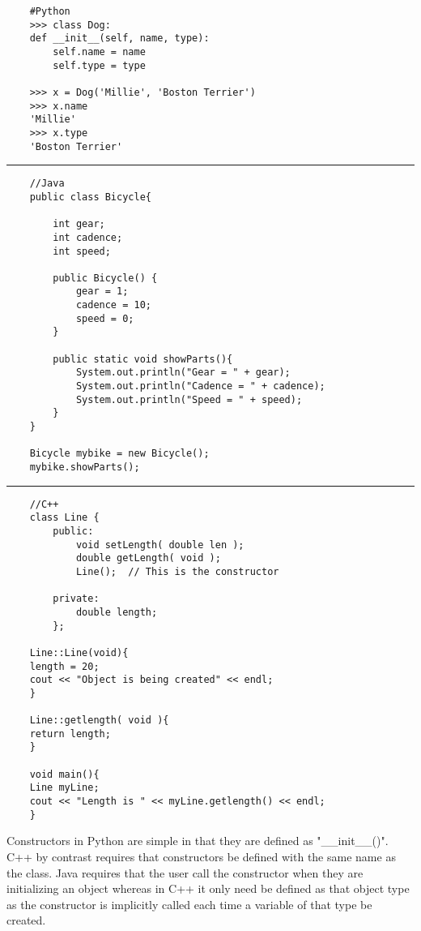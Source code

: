\documentclass[journal,10pt,onecolumn,compsoc]{IEEEtran} \usepackage[margin=1.0in]{geometry} \usepackage{pdfpages} \usepackage{graphicx}
\begin{document}
\begin{verbatim}
	#Python
	>>> class Dog:
	def __init__(self, name, type):
		self.name = name
		self.type = type

	>>> x = Dog('Millie', 'Boston Terrier')
	>>> x.name 
	'Millie'
	>>> x.type
	'Boston Terrier'
\end{verbatim}
\begin{center}
\noindent\rule{8cm}{0.4pt}
\end{center}
\begin{verbatim}
	//Java
	public class Bicycle{
    	
        int gear;
        int cadence;
        int speed;
        
		public Bicycle() {
			gear = 1;
			cadence = 10;
			speed = 0;
		}
        
		public static void showParts(){
			System.out.println("Gear = " + gear);
			System.out.println("Cadence = " + cadence);
			System.out.println("Speed = " + speed);
		}
	}

	Bicycle mybike = new Bicycle();
	mybike.showParts();
\end{verbatim}
\begin{center}
\noindent\rule{8cm}{0.4pt}
\end{center}
\begin{verbatim}
	//C++
	class Line {
		public:
			void setLength( double len );
			double getLength( void );
			Line();  // This is the constructor
 
		private:
			double length;
		};
    
	Line::Line(void){
	length = 20;
	cout << "Object is being created" << endl;
	}
    
    Line::getlength( void ){
	return length;
    }
    
    void main(){
	Line myLine;
	cout << "Length is " << myLine.getlength() << endl;
    }
\end{verbatim}

\noindent Constructors in Python are simple in that they are defined as "\_\_init\_\_()". 
C++ by contrast requires that constructors be defined with the same name as the class. \cite{cclass} 
Java requires that the user call the constructor when they are initializing an object whereas in C++ it only need be defined as that object type as the constructor is implicitly called each time a variable of that type be created. \cite{javaclass} 
\end{document}

